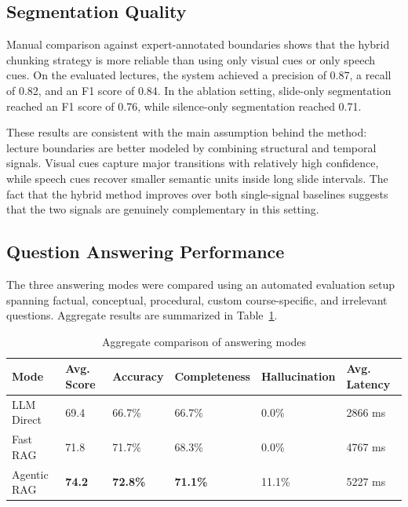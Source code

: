\subsection{Segmentation Quality}

Manual comparison against expert-annotated boundaries shows that the hybrid chunking strategy is more reliable than using only visual cues or only speech cues. On the evaluated lectures, the system achieved a precision of 0.87, a recall of 0.82, and an F1 score of 0.84. In the ablation setting, slide-only segmentation reached an F1 score of 0.76, while silence-only segmentation reached 0.71.

These results are consistent with the main assumption behind the method: lecture boundaries are better modeled by combining structural and temporal signals. Visual cues capture major transitions with relatively high confidence, while speech cues recover smaller semantic units inside long slide intervals. The fact that the hybrid method improves over both single-signal baselines suggests that the two signals are genuinely complementary in this setting.

\subsection{Question Answering Performance}

The three answering modes were compared using an automated evaluation setup spanning factual, conceptual, procedural, custom course-specific, and irrelevant questions. Aggregate results are summarized in Table~\ref{tab:rag-results}.

\begin{table}[H]
    \centering
    \caption{Aggregate comparison of answering modes}
    \label{tab:rag-results}
    \begin{tabular}{@{}llllll@{}}
        \toprule
        \textbf{Mode} & \textbf{Avg. Score} & \textbf{Accuracy} & \textbf{Completeness} & \textbf{Hallucination} & \textbf{Avg. Latency} \\ \midrule
        LLM Direct & 69.4 & 66.7\% & 66.7\% & 0.0\% & 2866 ms \\
        Fast RAG & 71.8 & 71.7\% & 68.3\% & 0.0\% & 4767 ms \\
        Agentic RAG & \textbf{74.2} & \textbf{72.8\%} & \textbf{71.1\%} & 11.1\% & 5227 ms \\ \bottomrule
    \end{tabular}
\end{table}

